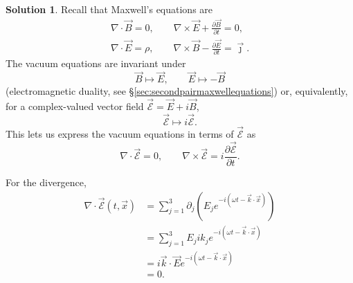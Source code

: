 \documentclass[11pt, a4paper]{report}
\theoremstyle{definition}
\newtheorem{sol}{Solution}[part]
\begin{document}
\begin{sol}

Recall that Maxwell's equations are
\begin{gather*}
    \nabla \cdot \vec{B} = 0, \qquad
    \nabla \times \vec{E} + \frac{\partial \vec{B}}{\partial t} = 0, \\
    \nabla \cdot \vec{E} = \rho, \qquad
    \nabla \times \vec{B} - \frac{\partial \vec{E}}{\partial t} = \vec{\jmath}.
\end{gather*}
The vacuum equations are invariant under
\[
    \vec{B} \mapsto \vec{E}, \qquad
    \vec{E} \mapsto - \vec{B}
\]
(electromagnetic duality, see \S\ref{sec:secondpairmaxwellequations}) or, equivalently, for a complex-valued vector field $\vec{\mathcal{E}} = \vec{E} + i \vec{B}$,
\[
    \vec{\mathcal{E}} \mapsto i \vec{\mathcal{E}}.
\]
This lets us express the vacuum equations in terms of $\vec{\mathcal{E}}$ as
\[
    \nabla \cdot \vec{\mathcal{E}} = 0, \qquad
    \nabla \times \vec{\mathcal{E}} = i \frac{\partial \vec{\mathcal{E}}}{\partial t}.
\]

For the divergence,
\begin{align*}
    \nabla \cdot \vec{\mathcal{E}}(t, \vec{x})
        &= \sum_{j = 1}^3 \partial_j \left( E_j  e^{-i(\omega t - \vec{k} \cdot \vec{x})} \right) \\
        &= \sum_{j = 1}^3 E_j i k_j e^{-i(\omega t - \vec{k} \cdot \vec{x})} \\
        &= i \vec{k} \cdot \vec{E} e^{-i(\omega t - \vec{k} \cdot \vec{x})} \\
        &= 0.
\end{align*}


\end{sol}
\end{document}
